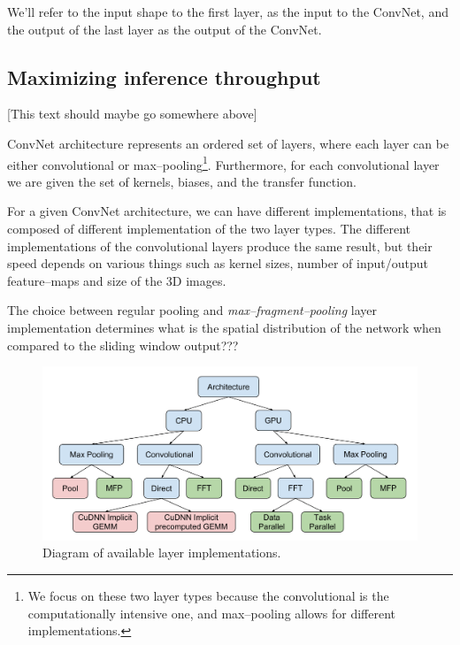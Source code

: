 \documentclass[conference]{IEEEtran}
\begin{document}
  We'll refer to the input shape to the first layer, as the input to
  the ConvNet, and the output of the last layer as the output of the
  ConvNet.

  \subsection{Maximizing inference throughput}

  [This text should maybe go somewhere above]

  ConvNet architecture represents an ordered set of layers, where each
  layer can be either convolutional or max--pooling\footnote{We focus
    on these two layer types because the convolutional is the
    computationally intensive one, and max--pooling allows for
    different implementations.}.  Furthermore, for each convolutional
  layer we are given the set of kernels, biases, and the transfer
  function.

  For a given ConvNet architecture, we can have different
  implementations, that is composed of different implementation of the
  two layer types.  The different implementations of the convolutional
  layers produce the same result, but their speed depends on various
  things such as kernel sizes, number of input/output feature--maps
  and size of the 3D images.

  The choice between regular pooling and \emph{max--fragment--pooling}
  layer implementation determines what is the spatial distribution of
  the network when compared to the sliding window output???

  \begin{figure}
    \begin{center}
      \includegraphics[width=0.99\columnwidth]{fig/layers.pdf}
    \end{center}
    \caption{Diagram of available layer implementations.}
    \label{fig:layers}
  \end{figure}
\end{document}
